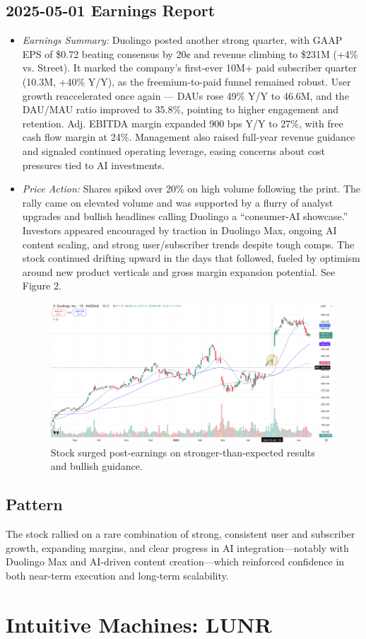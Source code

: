 \documentclass[11pt]{article}
\begin{document}
    \subsection{2025-05-01 Earnings Report}
        \begin{itemize}
            \item \textit{Earnings Summary:} Duolingo posted another strong quarter, with GAAP EPS of \$0.72 beating consensus by 20¢ and revenue climbing to \$231M (+4\% vs. Street). It marked the company’s first-ever 10M+ paid subscriber quarter (10.3M, +40\% Y/Y), as the freemium-to-paid funnel remained robust. User growth reaccelerated once again — DAUs rose 49\% Y/Y to 46.6M, and the DAU/MAU ratio improved to 35.8\%, pointing to higher engagement and retention. Adj. EBITDA margin expanded 900 bps Y/Y to 27\%, with free cash flow margin at 24\%. Management also raised full-year revenue guidance and signaled continued operating leverage, easing concerns about cost pressures tied to AI investments.
            \item \textit{Price Action:} Shares spiked over 20\% on high volume following the print. The rally came on elevated volume and was supported by a flurry of analyst upgrades and bullish headlines calling Duolingo a “consumer-AI showcase.” Investors appeared encouraged by traction in Duolingo Max, ongoing AI content scaling, and strong user/subscriber trends despite tough comps. The stock continued drifting upward in the days that followed, fueled by optimism around new product verticals and gross margin expansion potential. See Figure 2.
            \begin{figure}[h]
                \centering \includegraphics[width=0.8\linewidth]{images/DUOL2.png}
                \caption{Stock surged post-earnings on stronger-than-expected results and bullish guidance.}
            \end{figure}
        \end{itemize}
    \subsection{Pattern}
        The stock rallied on a rare combination of strong, consistent user and subscriber growth, expanding margins, and clear progress in AI integration—notably with Duolingo Max and AI-driven content creation—which reinforced confidence in both near-term execution and long-term scalability.  \section{Intuitive Machines: LUNR}
\end{document}
